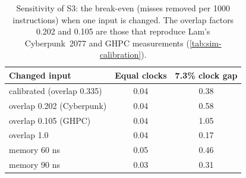 \begin{table}[htbp]
  \centering
  \caption[Sensitivity of S3: the break-even when one input is changed]{Sensitivity of S3: the break-even (misses removed per 1000 instructions) when one input is changed. The overlap factors 0.202 and 0.105 are those that reproduce Lam's Cyberpunk~2077 and GHPC measurements (\cref{tab:sim-calibration}).}
  \label{tab:sim-s3-sensitivity}
  \small
  \begin{tabular}{@{}lcc@{}}
    \toprule
    \textbf{Changed input} & \textbf{Equal clocks} & \textbf{7.3\% clock gap} \\
    \midrule
    calibrated (overlap 0.335) & 0.04 & 0.38 \\
    overlap 0.202 (Cyberpunk) & 0.04 & 0.58 \\
    overlap 0.105 (GHPC) & 0.04 & 1.05 \\
    overlap 1.0 & 0.04 & 0.17 \\
    memory 60 ns & 0.05 & 0.46 \\
    memory 90 ns & 0.03 & 0.31 \\
    \bottomrule
  \end{tabular}
\end{table}
